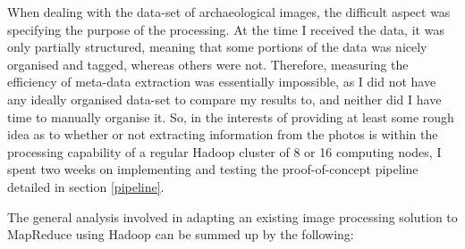 \documentclass [12pt,a4paper]{report}
\begin{document}
When dealing with the data-set of archaeological images, the difficult aspect was specifying the purpose of the processing. At the time I received the data, it was only partially structured, meaning that some portions of the data was nicely organised and tagged, whereas others were not. Therefore, measuring the efficiency of meta-data extraction was essentially impossible, as I did not have any ideally organised data-set to compare my results to, and neither did I have time to manually organise it. So, in the interests of providing at least some rough idea as to whether or not extracting information from the photos is within the processing capability of a regular Hadoop cluster of 8 or 16 computing nodes, I spent two weeks on implementing and testing the proof-of-concept pipeline detailed in section \ref{pipeline}.

The general analysis involved in adapting an existing image processing solution to MapReduce using Hadoop can be summed up by the following:
\end{document}
